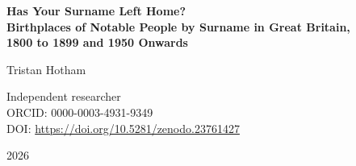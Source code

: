 \documentclass[11pt,a4paper]{article}
\begin{document}
\begin{center}
{\Large\bfseries Has Your Surname Left Home?\\[2pt] Birthplaces of Notable People by Surname in Great Britain,\\[2pt] 1800 to 1899 and 1950 Onwards\par}
\vspace{1.2em}
{\large Tristan Hotham\par}
\vspace{0.3em}
{\small Independent researcher\\
ORCID: 0000-0003-4931-9349\\
DOI: \href{https://doi.org/10.5281/zenodo.23761427}{https://doi.org/10.5281/zenodo.23761427}\par}
\vspace{0.8em}
2026
\end{center}
\end{document}
